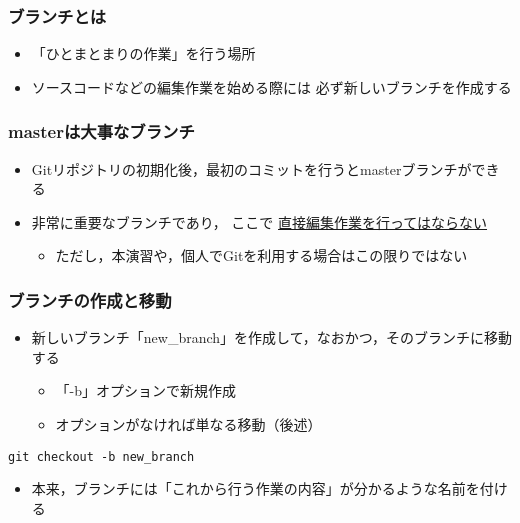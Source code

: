 \documentclass[a4paper,twoside,twocolumn]{bxjsarticle}
\begin{document}
\subsubsection{ブランチとは}
\label{sec-1-6-1}
\begin{itemize}
\item 「ひとまとまりの作業」を行う場所
\item ソースコードなどの編集作業を始める際には
必ず新しいブランチを作成する
\end{itemize}

\subsubsection{masterは大事なブランチ}
\label{sec-1-6-2}
\begin{itemize}
\item Gitリポジトリの初期化後，最初のコミットを行うとmasterブランチができる
\item 非常に重要なブランチであり，
ここで \uline{直接編集作業を行ってはならない}
\begin{itemize}
\item ただし，本演習や，個人でGitを利用する場合はこの限りではない
\end{itemize}
\end{itemize}

\subsubsection{ブランチの作成と移動}
\label{sec-1-6-3}
\begin{itemize}
\item 新しいブランチ「new\_branch」を作成して，なおかつ，そのブランチに移動する
\begin{itemize}
\item 「-b」オプションで新規作成
\item オプションがなければ単なる移動（後述）
\end{itemize}
\end{itemize}

\begin{verbatim}
git checkout -b new_branch
\end{verbatim}

\begin{itemize}
\item 本来，ブランチには「これから行う作業の内容」が分かるような名前を付ける
\end{itemize}
\end{document}
